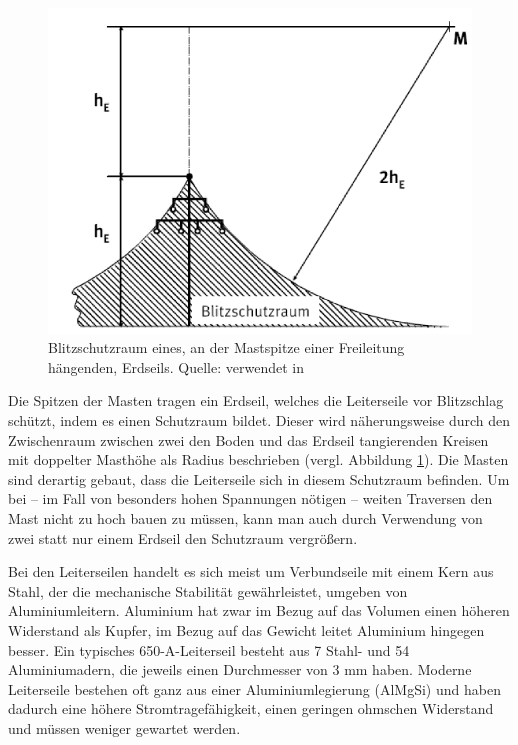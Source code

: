 \begin{figure}[tbhn]
\begin{center}
\noindent
\includegraphics[scale=0.8]{blitzschutzraum.png}
\end{center}
\caption{Blitzschutzraum eines, an der Mastspitze einer Freileitung hängenden, Erdseils. Quelle: \cite{Harnischmacher} verwendet in \cite{BfN}}
\label{pic:blitzschutzraum}
\end{figure}

Die Spitzen der Masten tragen ein Erdseil, welches die Leiterseile vor Blitzschlag schützt, indem es einen Schutzraum bildet. Dieser wird näherungsweise durch den Zwischenraum zwischen zwei den Boden und das Erdseil tangierenden Kreisen mit doppelter Masthöhe als Radius beschrieben (vergl. Abbildung \ref{pic:blitzschutzraum}). Die Masten sind derartig gebaut, dass die Leiterseile sich in diesem Schutzraum befinden. Um bei – im Fall von besonders hohen Spannungen nötigen – weiten Traversen den Mast nicht zu hoch bauen zu müssen, kann man auch durch Verwendung von zwei statt nur einem Erdseil den Schutzraum vergrößern.

Bei den Leiterseilen handelt es sich meist um Verbundseile mit einem Kern aus Stahl, der die mechanische Stabilität gewährleistet, umgeben von Aluminiumleitern. Aluminium hat zwar im Bezug auf das Volumen einen höheren Widerstand als Kupfer, im Bezug auf das Gewicht leitet Aluminium hingegen besser. %
Ein typisches 650-A-Leiterseil besteht aus 7 Stahl- und 54 Aluminiumadern, die jeweils einen Durchmesser von 3 mm haben\cite{Harrison}.
Moderne Leiterseile bestehen oft ganz aus einer Aluminiumlegierung (AlMgSi) und haben dadurch eine höhere Stromtragefähigkeit, einen geringen ohmschen Widerstand und müssen weniger gewartet werden\cite{Harrison}\cite{Flosdorff}.

